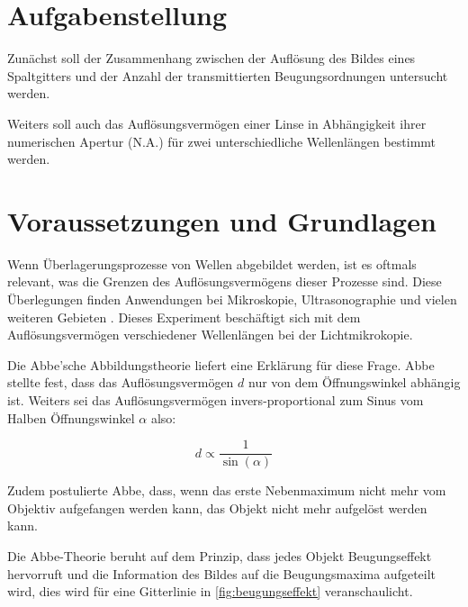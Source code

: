\documentclass[11pt,ngerman]{scrartcl}
\begin{document}

\tableofcontents
\newpage

\section{Aufgabenstellung\label{Auf0}}

Zunächst soll der Zusammenhang zwischen der Auflösung des Bildes eines
Spaltgitters und der Anzahl der transmittierten Beugungsordnungen untersucht
werden.

\noindent Weiters soll auch das Auflösungsvermögen einer Linse in Abhängigkeit
ihrer numerischen Apertur (N.A.) für zwei unterschiedliche Wellenlängen
bestimmt werden. \cite{abbevorlage}



\section{Voraussetzungen und Grundlagen}  %
\label{sec:voraussetzungen_grundlagen}

Wenn Überlagerungsprozesse von Wellen abgebildet werden, ist es oftmals
relevant, was die Grenzen des Auflösungsvermögens dieser Prozesse sind.
Diese Überlegungen finden Anwendungen bei Mikroskopie, Ultrasonographie
und vielen weiteren Gebieten \cite{wiki_aufl_2020}.
Dieses Experiment beschäftigt
sich mit dem Auflösungsvermögen verschiedener Wellenlängen bei der
Lichtmikrokopie.

\noindent Die Abbe'sche Abbildungstheorie liefert eine Erklärung für diese Frage. Abbe
stellte fest, dass das Auflösungsvermögen $d$ nur von dem Öffnungswinkel
abhängig ist. Weiters sei das Auflösungsvermögen invers-proportional zum Sinus vom
Halben Öffnungswinkel $\alpha$ also:

\begin{equation}
	d \propto \frac{1}{\sin(\alpha)}
	\label{eq:abbepropo}
\end{equation}

\vspace{2mm}

\noindent Zudem postulierte Abbe, dass, wenn das erste Nebenmaximum nicht mehr vom
Objektiv aufgefangen werden kann, das Objekt nicht mehr aufgelöst werden kann.\cite{demtroder2018ex2}

\noindent Die Abbe-Theorie beruht auf dem Prinzip, dass jedes Objekt Beugungseffekt hervorruft und
die Information des Bildes auf die Beugungsmaxima aufgeteilt wird, dies wird für eine Gitterlinie
in \autoref{fig:beugungseffekt} veranschaulicht.\cite{demtroder2018ex2}
\end{document}
